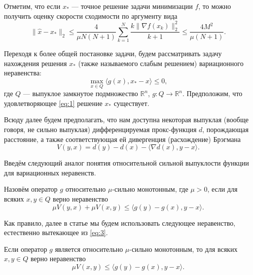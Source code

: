Отметим, что если $x_*$ --- точное решение задачи минимизации $f$, то можно получить оценку скорости сходимости по аргументу вида
\begin{equation} \label{arg_est}
    \|\widehat{x} - x_*\|_2 \leq \frac{4}{\mu N (N+1)} \sum_{k=1}^{N} \frac{k \|\nabla f(x_k)\|_2^2}{k+1} \leq \frac{4M^2}{\mu(N+1)}.
\end{equation}

Переходя к более общей постановке задачи, будем рассматривать задачу нахождения решения $x_*$ (также называемого слабым решением) вариационного неравенства: 
\begin{equation}\label{eq:1}
\max_{x \in Q} \langle g(x), x_* - x \rangle \leq 0,
\end{equation}
где $Q$ --- выпуклое замкнутое подмножество $\mathbb{R}^n$,
$g: Q \longrightarrow \mathbb{R}^n$. Предположим, что удовлетворяющее \eqref{eq:1} решение $x_*$ существует.

Всюду далее будем предполагать, что нам доступна некоторая выпуклая (вообще говоря, не сильно выпуклая) дифференцируемая прокс-функция $d$, порождающая расстояние, а также соответствующая ей дивергенция (расхождение) Брэгмана \cite{Bauschke}
\begin{equation}\label{Brg_form}
V(y, x) = d(y) - d(x) - \langle \nabla d(x), y - x \rangle.
\end{equation}

Введём следующий аналог понятия относительной сильной выпуклости функции \cite{Lu_Nesterov_2018} для вариационных неравенств.
\begin{definition}\label{DefRelStrongMonot}
Назовём оператор $g$ относительно $\mu$-сильно монотонным, где $\mu >0$, если для всяких $x, y \in Q$ верно неравенство
    \begin{equation}\label{eq:3}
         \mu V(y, x) + \mu V(x, y) \leq \langle g(y) - g(x), y - x \rangle.
     \end{equation}
\end{definition}
Как правило, далее в статье мы будем использовать следующее неравенство, естественно вытекающее из \eqref{eq:3}.
\begin{remark}
Если оператор $g$ является  относительно $\mu$-сильно монотонным, то для всяких $x, y \in Q$ верно неравенство
$$
         \mu V(x, y) \leq \langle g(y) - g(x), y - x \rangle.
$$
\end{remark}

